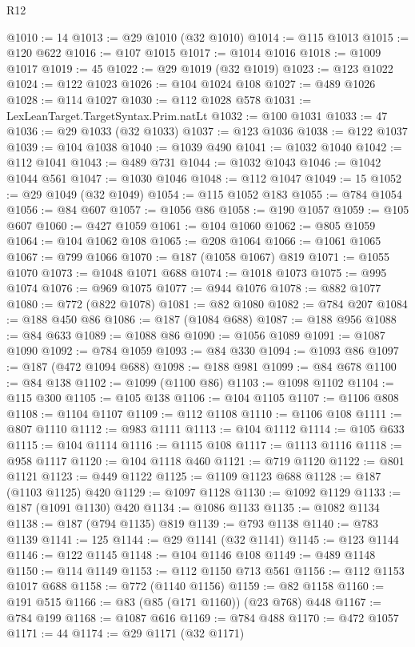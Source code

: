 \begin{lexlean}{R12}
\begin{coremodule}
@1010 := 14
@1013 := @29 @1010 (@32 @1010)
@1014 := @115 @1013
@1015 := @120 @622
@1016 := @107 @1015
@1017 := @1014 @1016
@1018 := @1009 @1017
@1019 := 45
@1022 := @29 @1019 (@32 @1019)
@1023 := @123 @1022
@1024 := @122 @1023
@1026 := @104 @1024 @108
@1027 := @489 @1026
@1028 := @114 @1027
@1030 := @112 @1028 @578
@1031 := LexLeanTarget.TargetSyntax.Prim.natLt
@1032 := @100 @1031
@1033 := 47
@1036 := @29 @1033 (@32 @1033)
@1037 := @123 @1036
@1038 := @122 @1037
@1039 := @104 @1038
@1040 := @1039 @490
@1041 := @1032 @1040
@1042 := @112 @1041
@1043 := @489 @731
@1044 := @1032 @1043
@1046 := @1042 @1044 @561
@1047 := @1030 @1046
@1048 := @112 @1047
@1049 := 15
@1052 := @29 @1049 (@32 @1049)
@1054 := @115 @1052 @183
@1055 := @784 @1054
@1056 := @84 @607
@1057 := @1056 @86
@1058 := @190 @1057
@1059 := @105 @607
@1060 := @427 @1059
@1061 := @104 @1060
@1062 := @805 @1059
@1064 := @104 @1062 @108
@1065 := @208 @1064
@1066 := @1061 @1065
@1067 := @799 @1066
@1070 := @187 (@1058 @1067) @819
@1071 := @1055 @1070
@1073 := @1048 @1071 @688
@1074 := @1018 @1073
@1075 := @995 @1074
@1076 := @969 @1075
@1077 := @944 @1076
@1078 := @882 @1077
@1080 := @772 (@822 @1078)
@1081 := @82 @1080
@1082 := @784 @207
@1084 := @188 @450 @86
@1086 := @187 (@1084 @688)
@1087 := @188 @956
@1088 := @84 @633
@1089 := @1088 @86
@1090 := @1056 @1089
@1091 := @1087 @1090
@1092 := @784 @1059
@1093 := @84 @330
@1094 := @1093 @86
@1097 := @187 (@472 @1094 @688)
@1098 := @188 @981
@1099 := @84 @678
@1100 := @84 @138
@1102 := @1099 (@1100 @86)
@1103 := @1098 @1102
@1104 := @115 @300
@1105 := @105 @138
@1106 := @104 @1105
@1107 := @1106 @808
@1108 := @1104 @1107
@1109 := @112 @1108
@1110 := @1106 @108
@1111 := @807 @1110
@1112 := @983 @1111
@1113 := @104 @1112
@1114 := @105 @633
@1115 := @104 @1114
@1116 := @1115 @108
@1117 := @1113 @1116
@1118 := @958 @1117
@1120 := @104 @1118 @460
@1121 := @719 @1120
@1122 := @801 @1121
@1123 := @449 @1122
@1125 := @1109 @1123 @688
@1128 := @187 (@1103 @1125) @420
@1129 := @1097 @1128
@1130 := @1092 @1129
@1133 := @187 (@1091 @1130) @420
@1134 := @1086 @1133
@1135 := @1082 @1134
@1138 := @187 (@794 @1135) @819
@1139 := @793 @1138
@1140 := @783 @1139
@1141 := 125
@1144 := @29 @1141 (@32 @1141)
@1145 := @123 @1144
@1146 := @122 @1145
@1148 := @104 @1146 @108
@1149 := @489 @1148
@1150 := @114 @1149
@1153 := @112 @1150 @713 @561
@1156 := @112 @1153 @1017 @688
@1158 := @772 (@1140 @1156)
@1159 := @82 @1158
@1160 := @191 @515
@1166 := @83 (@85 (@171 @1160)) (@23 @768) @448
@1167 := @784 @199
@1168 := @1087 @616
@1169 := @784 @488
@1170 := @472 @1057
@1171 := 44
@1174 := @29 @1171 (@32 @1171)

\end{coremodule}
\end{lexlean}
